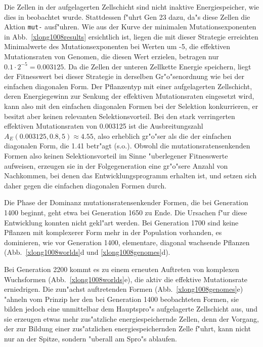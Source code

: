 Die Zellen in der aufgelagerten Zellschicht sind nicht inaktive Energiespeicher, wie dies in
 beobachtet wurde. Stattdessen f"uhrt Gen 23 dazu, da"s diese Zellen die
Aktion \verb|mut-| ausf"uhren. Wie aus der Kurve der minimalen Mutationsexponenten in Abb.\ \ref{xlong1008results}
ersichtlich ist, liegen die mit dieser Strategie erreichten Minimalwerte des Mutationsexponenten bei
Werten um -5, die effektiven Mutationsraten von Genomen, die diesen Wert erzielen, betragen nur
$0.1 \cdot 2^{-5} = 0.003125$. Da die Zellen der unteren Zellkette Energie speichern, liegt der
Fitnesswert bei dieser Strategie in derselben Gr"o"senordnung wie bei der einfachen diagonalen
Form. Der Pflanzentyp mit einer aufgelagerten Zellschicht, deren Energiegewinn zur Senkung der
effektiven Mutationsraten eingesetzt wird, kann also mit den einfachen diagonalen
Formen bei der Selektion konkurrieren, er besitzt aber keinen relevanten Selektionsvorteil.
Bei den stark verringerten effektiven Mutationsraten von 0.003125 ist die Ausbreitungszahl
$A_E(0.003125, 0.8, 5) \approx 4.55$, also erheblich gr"o"ser als die der einfachen diagonalen
Form, die 1.41 betr"agt (s.o.).
Obwohl die mutationsratensenkenden Formen also keinen Selektionsvorteil im Sinne "uberlegener
Fitnesswerte aufweisen, erzeugen sie in der Folgegeneration eine gr"o"sere Anzahl von
Nachkommen, bei denen das Entwicklungsprogramm erhalten ist, und setzen sich daher gegen
die einfachen diagonalen Formen durch.

Die Phase der Dominanz mutationsratensenkender Formen, die bei Generation 1400 beginnt, geht
etwa bei Generation 1650 zu Ende. Die Ursachen f"ur diese Entwicklung konnten nicht gekl"art 
werden. Bei Generation 1700 sind keine Pflanzen mit komplexerer Form mehr in der Population
vorhanden, es dominieren, wie vor Generation 1400, elementare, diagonal wachsende Pflanzen
(Abb.\ \ref{xlong1008worlds}d und \ref{xlong1008genomes}d).

Bei Generation 2200 kommt es zu einem erneuten Auftreten von komplexen Wuchsformen
(Abb.\ \ref{xlong1008worlds}e), die aktiv die effektive Mutationsrate erniedrigen. Die zun"achst
auftretenden Formen (Abb.\ \ref{xlong1008genomes}e) "ahneln vom Prinzip her den bei Generation
1400 beobachteten Formen, sie bilden jedoch eine unmittelbar dem Hauptspro"s aufgelagerte
Zellschicht aus, und sie erzeugen etwas mehr zus"atzliche energiespeichernde Zellen, denn der
Vorgang, der zur Bildung einer zus"atzlichen energiespeichernden Zelle f"uhrt, kann 
nicht nur an der Spitze, sondern "uberall am Spro"s ablaufen.

